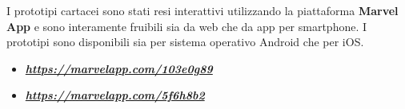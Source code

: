 I prototipi cartacei sono stati resi interattivi utilizzando la piattaforma \textbf{Marvel App} e sono interamente fruibili sia da web che da app per smartphone. I prototipi sono disponibili sia per sistema operativo Android che per iOS.

\begin{itemize}

\item{ \href{https://marvelapp.com/103e0g89}{\emph{\textbf{https://marvelapp.com/103e0g89}}}}
\item{ \href{https://marvelapp.com/5f6h8b2}{\emph{\textbf{https://marvelapp.com/5f6h8b2}}}}

\end{itemize}